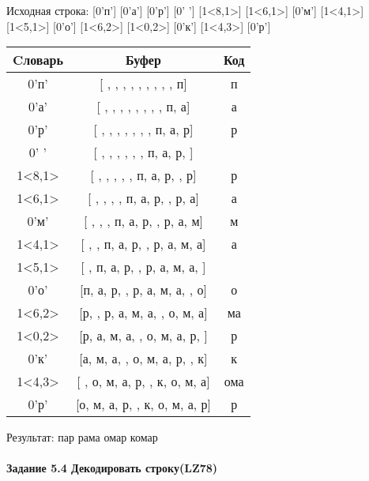 \documentclass[a4paper, 12pt]{article}
\begin{document}
Исходная строка: [0'п'] [0'а'] [0'р'] [0' '] [1<8,1>] [1<6,1>] [0'м'] [1<4,1>] [1<5,1>] [0'о'] [1<6,2>] [1<0,2>] [0'к'] [1<4,3>] [0'р']\\
\begin{table}[h!]
\centering
\begin{tabular}{|c|c|c|}
\hline
 Cловарь & Буфер & Код  \\ \hline
0'п' & [ ,  ,  ,  ,  ,  ,  ,  ,  , п] & п
\\ \hline
0'а' & [ ,  ,  ,  ,  ,  ,  ,  , п, а] & а
\\ \hline
0'р' & [ ,  ,  ,  ,  ,  ,  , п, а, р] & р
\\ \hline
0' ' & [ ,  ,  ,  ,  ,  , п, а, р,  ] &  
\\ \hline
1<8,1> & [ ,  ,  ,  ,  , п, а, р,  , р] & р
\\ \hline
1<6,1> & [ ,  ,  ,  , п, а, р,  , р, а] & а
\\ \hline
0'м' & [ ,  ,  , п, а, р,  , р, а, м] & м
\\ \hline
1<4,1> & [ ,  , п, а, р,  , р, а, м, а] & а
\\ \hline
1<5,1> & [ , п, а, р,  , р, а, м, а,  ] &  
\\ \hline
0'о' & [п, а, р,  , р, а, м, а,  , о] & о
\\ \hline
1<6,2> & [р,  , р, а, м, а,  , о, м, а] & ма
\\ \hline
1<0,2> & [р, а, м, а,  , о, м, а, р,  ] & р 
\\ \hline
0'к' & [а, м, а,  , о, м, а, р,  , к] & к
\\ \hline
1<4,3> & [ , о, м, а, р,  , к, о, м, а] & ома
\\ \hline
0'р' & [о, м, а, р,  , к, о, м, а, р] & р
\\ \hline
\end{tabular}
\end{table}

Результат: пар рама омар комар
\pagebreak
\paragraph{Задание 5.4 Декодировать строку(LZ78)\\}
\end{document}
